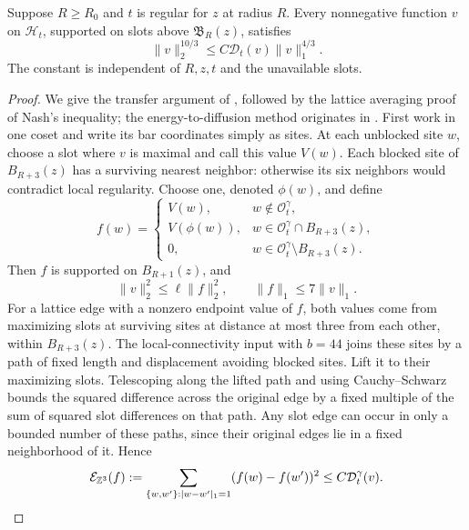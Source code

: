 \begin{proposition}\label{prop:nash}
Suppose \(R\ge R_0\) and \(t\) is regular for \(z\) at radius \(R\).
Every nonnegative function \(v\) on \(\mathcal H_t\), supported on
slots above \(\mathfrak B_R(z)\), satisfies
\begin{equation}\label{eq:local-nash}
 \|v\|_2^{10/3}\le C\mathcal D_t(v)\|v\|_1^{4/3}.
\end{equation}
The constant is independent of \(R,z,t\) and the unavailable slots.
\end{proposition}

\begin{proof}
We give the transfer argument of \cite[Proposition~5.6]{Ordering},
followed by the lattice averaging proof of Nash's inequality; the
energy-to-diffusion method originates in \cite{Nash1958}.
First work in one coset and write its bar coordinates simply as sites.
At each unblocked site \(w\), choose a slot where \(v\) is maximal
and call this value \(V(w)\).  Each blocked site of \(B_{R+3}(z)\)
has a surviving nearest neighbor: otherwise its six neighbors would
contradict local regularity.  Choose one, denoted \(\phi(w)\), and define
\[
 f(w)=
 \begin{cases}
 V(w),&w\notin\mathcal O_t^\gamma,\\
 V(\phi(w)),&w\in\mathcal O_t^\gamma\cap B_{R+3}(z),\\
 0,&w\in\mathcal O_t^\gamma\setminus B_{R+3}(z).
 \end{cases}
\]
Then \(f\) is supported on \(B_{R+1}(z)\), and
\begin{equation}\label{eq:nash-norm-transfer}
 \|v\|_2^2\le\ell\|f\|_2^2,
 \qquad \|f\|_1\le7\|v\|_1.
\end{equation}
For a lattice edge with a nonzero endpoint value of \(f\), both
values come from maximizing slots at surviving sites at distance at
most three from each other, within \(B_{R+3}(z)\).
The local-connectivity input with \(b=44\) joins these sites by a path of fixed length
and displacement avoiding blocked sites.  Lift it to their maximizing
slots.  Telescoping along the lifted path and using Cauchy--Schwarz
bounds the squared difference across the original edge by a fixed
multiple of the sum of squared slot differences on that path.
Any slot edge can occur in only a bounded number of these paths,
since their original edges lie in a fixed neighborhood of it.  Hence
\begin{equation}\label{eq:nash-energy-transfer}
 \mathcal E_{\mathbb Z^3}(f):=
 \sum_{\{w,w'\}:|w-w'|_1=1}(f(w)-f(w'))^2
 \le C\mathcal D_t^\gamma(v).
\end{equation}


\end{proof}
